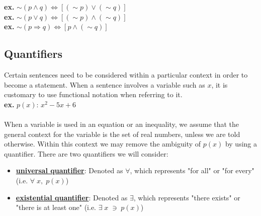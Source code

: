 \documentclass[11pt]{article}
\begin{document}
\indent \indent \indent \textbf{ex. } $\sim(p\land q) \Leftrightarrow [(\sim p)\lor (\sim q)] $ \\
\indent \indent \indent \textbf{ex. } $ \sim (p \lor q) \Leftrightarrow [(\sim p) \land ( \sim q)]$ \\
\indent \indent \indent \textbf{ex. } $ \sim (p \Rightarrow q) \Leftrightarrow [ p \land ( \sim q)]$
\pagebreak


\subsection{Quantifiers}
Certain sentences need to be considered within a particular context in order to become a statement. When a sentence involves a variable such as $x$, it is customary to use functional notation when referring to it. \\ 

\textbf{ex.} $p(x)$: $x^2 - 5x + 6$
\\ \\
When a variable is used in an equation or an inequality, we assume that the general context for the variable is the set of real numbers, unless we are told otherwise. Within this context we may remove the ambiguity of $p(x)$ by using a quantifier.  There are two quantifiers we will consider:
\begin{itemize}
\item \underline{\textbf{universal quantifier}}: Denoted as $\forall$, which represents "for all" or "for every" (i.e. $\forall \;x, \; p(x)$)
\item \underline{\textbf{existential quantifier}}: Denoted as $\exists$, which represents "there exists" or "there is at least one" (i.e. $\exists \; x \; \ni \;  p(x)$)

\end{itemize}
\end{document}
